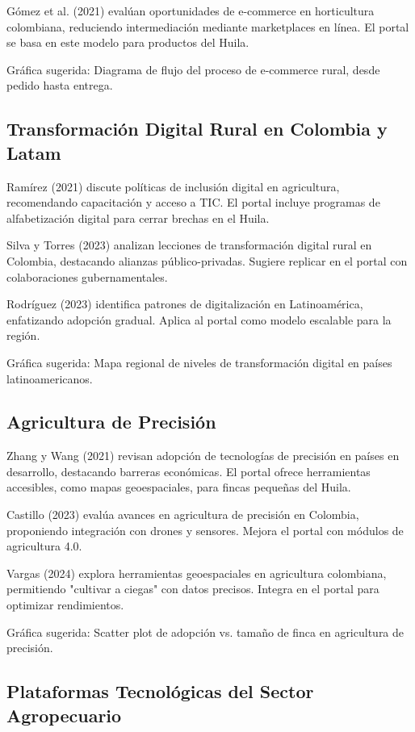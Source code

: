 Gómez et al. (2021) evalúan oportunidades de e-commerce en horticultura colombiana, reduciendo intermediación mediante marketplaces en línea. El portal se basa en este modelo para productos del Huila.

Gráfica sugerida: Diagrama de flujo del proceso de e-commerce rural, desde pedido hasta entrega.

\subsection{Transformación Digital Rural en Colombia y Latam}

Ramírez (2021) discute políticas de inclusión digital en agricultura, recomendando capacitación y acceso a TIC. El portal incluye programas de alfabetización digital para cerrar brechas en el Huila.

Silva y Torres (2023) analizan lecciones de transformación digital rural en Colombia, destacando alianzas público-privadas. Sugiere replicar en el portal con colaboraciones gubernamentales.

Rodríguez (2023) identifica patrones de digitalización en Latinoamérica, enfatizando adopción gradual. Aplica al portal como modelo escalable para la región.

Gráfica sugerida: Mapa regional de niveles de transformación digital en países latinoamericanos.

\subsection{Agricultura de Precisión}

Zhang y Wang (2021) revisan adopción de tecnologías de precisión en países en desarrollo, destacando barreras económicas. El portal ofrece herramientas accesibles, como mapas geoespaciales, para fincas pequeñas del Huila.

Castillo (2023) evalúa avances en agricultura de precisión en Colombia, proponiendo integración con drones y sensores. Mejora el portal con módulos de agricultura 4.0.

Vargas (2024) explora herramientas geoespaciales en agricultura colombiana, permitiendo "cultivar a ciegas" con datos precisos. Integra en el portal para optimizar rendimientos.

Gráfica sugerida: Scatter plot de adopción vs. tamaño de finca en agricultura de precisión.

\subsection{Plataformas Tecnológicas del Sector Agropecuario}


